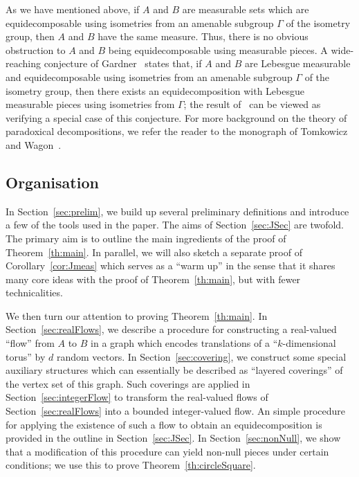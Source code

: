 \documentclass[12pt,a4paper]{amsart}
\numberwithin{equation}{section}
\theoremstyle{definition}
\begin{document}
As we have mentioned above, if $A$ and $B$ are measurable sets which are equidecomposable using isometries from an amenable subgroup $\Gamma$ of the isometry group, then $A$ and $B$ have the same measure. Thus, there is no obvious obstruction to $A$ and $B$ being equidecomposable using measurable pieces. A wide-reaching conjecture of Gardner~\cite[Conjecture~6]{Gardner91} states that, if $A$ and $B$ are Lebesgue measurable and equidecomposable using isometries from an amenable subgroup $\Gamma$ of the isometry group, then there exists an equidecomposition with Lebesgue measurable pieces using isometries from $\Gamma$; the result of~\cite{GrabowskiMathePikhurko17} can be viewed as verifying a special case of this conjecture. For more background on the theory of paradoxical decompositions, we refer the reader to the monograph of Tomkowicz and Wagon~\cite{TomkowiczWagon16}.

\vspace{-0.05em}


\subsection{Organisation}

In Section~\ref{sec:prelim}, we build up several preliminary definitions and introduce a few of the tools used in the paper. The aims of Section~\ref{sec:JSec} are twofold. The primary aim is to outline the main ingredients of the proof of Theorem~\ref{th:main}. In parallel, we will also sketch a separate proof of Corollary~\ref{cor:Jmeas} which serves as a ``warm up'' in the sense that it shares many core ideas with the proof of Theorem~\ref{th:main}, but with fewer technicalities. 

We then turn our attention to proving Theorem~\ref{th:main}. In Section~\ref{sec:realFlows}, we describe a procedure for constructing a real-valued ``flow'' from $A$ to $B$ in a graph which encodes translations of a ``$k$-dimensional torus'' by $d$ random vectors. In Section~\ref{sec:covering}, we construct some special auxiliary structures which can essentially be described as ``layered coverings'' of the vertex set of this graph. Such coverings are applied in Section~\ref{sec:integerFlow} to transform the real-valued flows of Section~\ref{sec:realFlows} into a bounded integer-valued flow. An simple procedure for applying the existence of such a flow to obtain an equidecomposition is provided in the outline in Section~\ref{sec:JSec}. In Section~\ref{sec:nonNull}, we show that a modification of this procedure can yield non-null pieces under certain conditions; we use this to prove Theorem~\ref{th:circleSquare}. 
\end{document}
